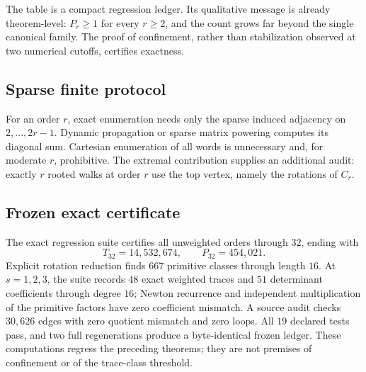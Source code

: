 The table is a compact regression ledger.  Its qualitative message is
already theorem-level: \(P_r\ge1\) for every \(r\ge2\), and the count grows
far beyond the single canonical family.  The proof of confinement, rather
than stabilization observed at two numerical cutoffs, certifies exactness.

\subsection{Sparse finite protocol}

For an order \(r\), exact enumeration needs only the sparse induced adjacency
on \(2,\ldots,2r-1\).  Dynamic propagation or sparse matrix powering computes
its diagonal sum.  Cartesian enumeration of all words is unnecessary and,
for moderate \(r\), prohibitive.  The extremal contribution supplies an
additional audit: exactly \(r\) rooted walks at order \(r\) use the top
vertex, namely the rotations of \(C_r\).

\subsection{Frozen exact certificate}

The exact regression suite certifies all unweighted orders through \(32\),
ending with
\[
 T_{32}=14{,}532{,}674,
 \qquad
 P_{32}=454{,}021.
\]
Explicit rotation reduction finds \(667\) primitive classes through length
\(16\).  At \(s=1,2,3\), the suite records \(48\) exact weighted traces and
\(51\) determinant coefficients through degree \(16\); Newton recurrence and
independent multiplication of the primitive factors have zero coefficient
mismatch.  A source audit checks \(30{,}626\) edges with zero quotient
mismatch and zero loops.  All \(19\) declared tests pass, and two full
regenerations produce a byte-identical frozen ledger.  These computations
regress the preceding theorems; they are not premises of confinement or of
the trace-class threshold.
